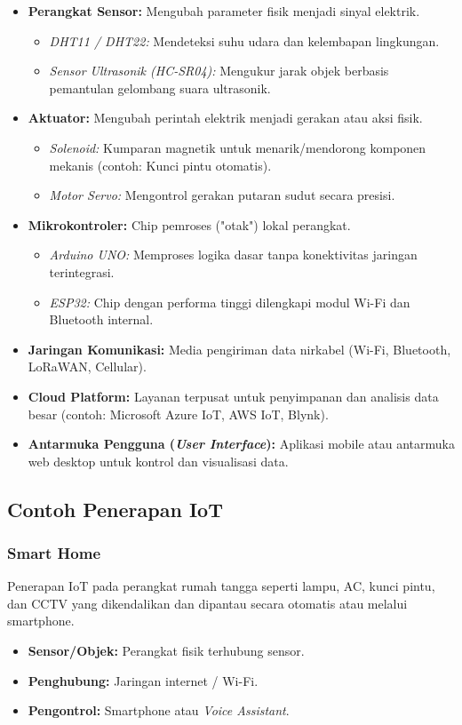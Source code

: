 \begin{itemize}
    \item \textbf{Perangkat Sensor:} Mengubah parameter fisik menjadi sinyal elektrik.
    \begin{itemize}
        \item \textit{DHT11 / DHT22:} Mendeteksi suhu udara dan kelembapan lingkungan.
        \item \textit{Sensor Ultrasonik (HC-SR04):} Mengukur jarak objek berbasis pemantulan gelombang suara ultrasonik.
    \end{itemize}
    \item \textbf{Aktuator:} Mengubah perintah elektrik menjadi gerakan atau aksi fisik.
    \begin{itemize}
        \item \textit{Solenoid:} Kumparan magnetik untuk menarik/mendorong komponen mekanis (contoh: Kunci pintu otomatis).
        \item \textit{Motor Servo:} Mengontrol gerakan putaran sudut secara presisi.
    \end{itemize}
    \item \textbf{Mikrokontroler:} Chip pemroses ("otak") lokal perangkat.
    \begin{itemize}
        \item \textit{Arduino UNO:} Memproses logika dasar tanpa konektivitas jaringan terintegrasi.
        \item \textit{ESP32:} Chip dengan performa tinggi dilengkapi modul Wi-Fi dan Bluetooth internal.
    \end{itemize}
    \item \textbf{Jaringan Komunikasi:} Media pengiriman data nirkabel (Wi-Fi, Bluetooth, LoRaWAN, Cellular).
    \item \textbf{Cloud Platform:} Layanan terpusat untuk penyimpanan dan analisis data besar (contoh: Microsoft Azure IoT, AWS IoT, Blynk).
    \item \textbf{Antarmuka Pengguna (\textit{User Interface}):} Aplikasi mobile atau antarmuka web desktop untuk kontrol dan visualisasi data.
\end{itemize}

\subsection{Contoh Penerapan IoT}

\subsubsection{Smart Home}
Penerapan IoT pada perangkat rumah tangga seperti lampu, AC, kunci pintu, dan CCTV yang dikendalikan dan dipantau secara otomatis atau melalui smartphone.
\begin{itemize}
    \item \textbf{Sensor/Objek:} Perangkat fisik terhubung sensor.
    \item \textbf{Penghubung:} Jaringan internet / Wi-Fi.
    \item \textbf{Pengontrol:} Smartphone atau \textit{Voice Assistant}.
\end{itemize}

